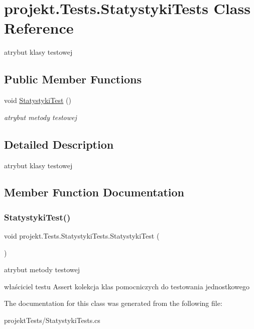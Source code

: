 \hypertarget{classprojekt_1_1_tests_1_1_statystyki_tests}{}\section{projekt.\+Tests.\+Statystyki\+Tests Class Reference}
\label{classprojekt_1_1_tests_1_1_statystyki_tests}


atrybut klasy testowej  


\subsection*{Public Member Functions}
\begin{DoxyCompactItemize}
\item 
void \mbox{\hyperlink{classprojekt_1_1_tests_1_1_statystyki_tests_a73c12d240c051a37e71775979940f5dc}{Statystyki\+Test}} ()
\begin{DoxyCompactList}\small\item\em atrybut metody testowej \end{DoxyCompactList}\end{DoxyCompactItemize}


\subsection{Detailed Description}
atrybut klasy testowej 

\subsection{Member Function Documentation}
\mbox{\label{classprojekt_1_1_tests_1_1_statystyki_tests_a73c12d240c051a37e71775979940f5dc}} 
\subsubsection{\texorpdfstring{Statystyki\+Test()}{StatystykiTest()}}
{\footnotesize\ttfamily void projekt.\+Tests.\+Statystyki\+Tests.\+Statystyki\+Test (\begin{DoxyParamCaption}{ }\end{DoxyParamCaption})\hspace{0.3cm}{\ttfamily [inline]}}



atrybut metody testowej 

właściciel testu Assert kolekcja klas pomocniczych do testowania jednostkowego 

The documentation for this class was generated from the following file\+:\begin{DoxyCompactItemize}
\item 
projekt\+Tests/Statystyki\+Tests.\+cs\end{DoxyCompactItemize}
